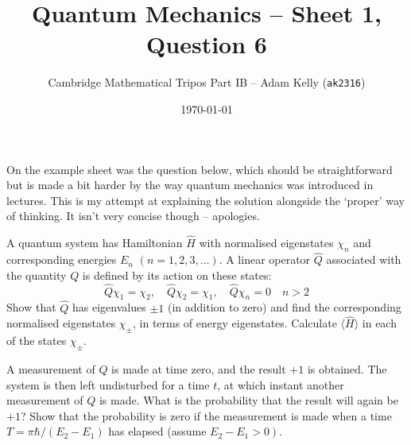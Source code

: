 \documentclass[a4paper]{scrartcl}
\title{Quantum Mechanics -- Sheet 1, Question 6}
\author{Cambridge Mathematical Tripos Part IB -- Adam Kelly (\texttt{ak2316})}
\date{\today}
\begin{document}
\maketitle

On the example sheet was the question below, which should be straightforward but is made a bit harder by the way quantum mechanics was introduced in lectures. This is my attempt at explaining the solution alongside the `proper' way of thinking.
It isn't very concise though -- apologies.

\begin{problem*}
	A quantum system has Hamiltonian $\hat{H}$ with normalised eigenstates $\chi_{n}$ and corresponding energies $E_{n}$ $(n=1,2,3, \ldots)$. A linear operator $\hat{Q}$ associated with the quantity $Q$ is defined by its action on these states:
$$
\hat{Q} \chi_{1}=\chi_{2}, \quad \hat{Q} \chi_{2}=\chi_{1}, \quad \hat{Q} \chi_{n}=0 \quad n>2
$$
Show that $\hat{Q}$ has eigenvalues $\pm 1$ (in addition to zero) and find the corresponding normalised eigenstates $\chi_{\pm}$, in terms of energy eigenstates. Calculate $\langle\hat{H}\rangle$ in each of the states $\chi_{\pm}$.

A measurement of $Q$ is made at time zero, and the result $+1$ is obtained. The system is then left undisturbed for a time $t$, at which instant another measurement of $Q$ is made. What is the probability
that the result will again be $+1$? Show that the probability is zero if the measurement is made when a time $T=\pi \hbar /\left(E_{2}-E_{1}\right)$ has elapsed (assume $\left.E_{2}-E_{1}>0\right)$.
\end{problem*}
\end{document}
